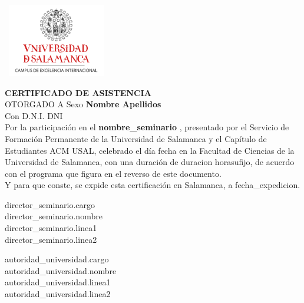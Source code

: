\documentclass[spanish]{article}
\begin{document}
\hbox{
	\includegraphics[height=3.2cm]{usallogo}
	\hspace{14.2cm}
}
\vspace{0.5cm}
\begin{center}

{\LARGE \textbf{CERTIFICADO DE ASISTENCIA}\\[0.5cm]}
{\Large OTORGADO A {{Sexo}}\textbf{ {{Nombre}} {{Apellidos}} }\\[0.2cm]}
{Con D.N.I. {{DNI}}\\[0.3cm]}
{\large Por la participación en el\textbf{ {{nombre_seminario}} }, presentado por el Servicio de Formación Permanente de la Universidad de Salamanca y el Capítulo de Estudiantes ACM USAL, celebrado el día {{fecha}} en la Facultad de Ciencias de la Universidad de Salamanca, con una duración de {{duracion}} hora{{sufijo}}, de acuerdo con el programa que figura en el reverso de este documento.\\[0.5cm]
Y para que conste, se expide esta certificación en Salamanca, a {{fecha_expedicion}}.\\}

\vspace*{2cm}

\parbox{0.9\textwidth}{
	\parbox{7cm}{
		\centering
		{{director_seminario.cargo}}\\
		\vspace*{2cm}
		{{director_seminario.nombre}}\\
		{{director_seminario.linea1}}\\
		{{director_seminario.linea2}}
	}
	\hfill
	\parbox{7cm}{
		\centering
		{{autoridad_universidad.cargo}}\\
		\vspace*{2cm}
		{{autoridad_universidad.nombre}}\\
		{{autoridad_universidad.linea1}}\\
		{{autoridad_universidad.linea2}}
	}
}
\end{center}
\newpage
\end{document}
